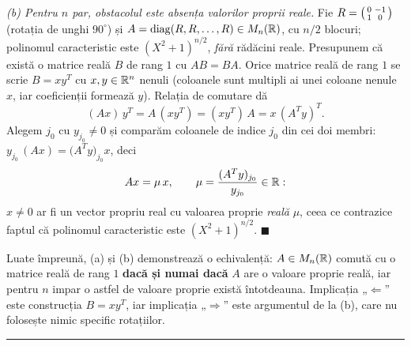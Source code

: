 \emph{(b) Pentru $n$ par, obstacolul este absența valorilor proprii reale.} Fie $R = \begin{psmallmatrix} 0 & -1 \\ 1 & 0 \end{psmallmatrix}$ (rotația de unghi $90^\circ$) și $A = \operatorname{diag}(R, R, \dots, R) \in M_n(\mathbb{R})$, cu $n/2$ blocuri; polinomul caracteristic este $(X^2+1)^{n/2}$, \emph{fără} rădăcini reale. Presupunem că există o matrice reală $B$ de rang $1$ cu $AB = BA$. Orice matrice reală de rang $1$ se scrie $B = xy^T$ cu $x, y \in \mathbb{R}^n$ nenuli (coloanele sunt multipli ai unei coloane nenule $x$, iar coeficienții formează $y$). Relația de comutare dă
\[
(Ax)\,y^T = A\,(xy^T) = (xy^T)\,A = x\,(A^T y)^T.
\]
Alegem $j_0$ cu $y_{j_0} \neq 0$ și comparăm coloanele de indice $j_0$ din cei doi membri: $y_{j_0}\,(Ax) = \big(A^T y\big)_{j_0} x$, deci
\[
Ax = \mu\,x, \qquad \mu = \frac{(A^T y)_{j_0}}{y_{j_0}} \in \mathbb{R} :
\]
$x \neq 0$ ar fi un vector propriu real cu valoarea proprie \emph{reală} $\mu$, ceea ce contrazice faptul că polinomul caracteristic este $(X^2+1)^{n/2}$. $\blacksquare$

\begin{obs}
Luate împreună, (a) și (b) demonstrează o echivalență: $A \in M_n(\mathbb{R})$ comută cu o matrice reală de rang $1$ \textbf{dacă și numai dacă} $A$ are o valoare proprie reală, iar pentru $n$ impar o astfel de valoare proprie există întotdeauna. Implicația „$\Leftarrow$'' este construcția $B = xy^T$, iar implicația „$\Rightarrow$'' este argumentul de la (b), care nu folosește nimic specific rotațiilor.
\end{obs}
\vspace{1mm}\hrule

